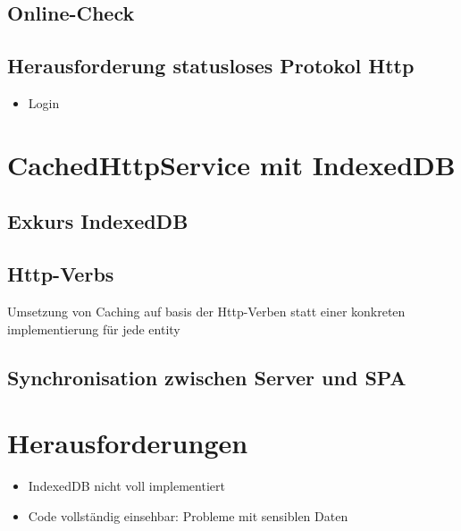 \subsection{Online-Check}
\label{ssec:Online-Check}

\subsection{Herausforderung statusloses Protokol Http}
\label{ssec:statusloses-http}

\begin{itemize}
\item Login
\end{itemize}

\section{CachedHttpService mit IndexedDB}
\label{sec:CachedHttpService}

\subsection{Exkurs IndexedDB}
\label{ssec:Exkurs-IndexedDB}

\subsection{Http-Verbs}
\label{ssec:Http-Verbs}

Umsetzung von Caching auf basis der Http-Verben statt einer konkreten implementierung für jede entity

\subsection{Synchronisation zwischen Server und SPA}
\label{ssec:Sync-SPA}

\section{Herausforderungen}
\label{sec:Herausforderungen-SPA}

\begin{itemize}
\item IndexedDB nicht voll implementiert
\item Code vollständig einsehbar: Probleme mit sensiblen Daten
\end{itemize}
